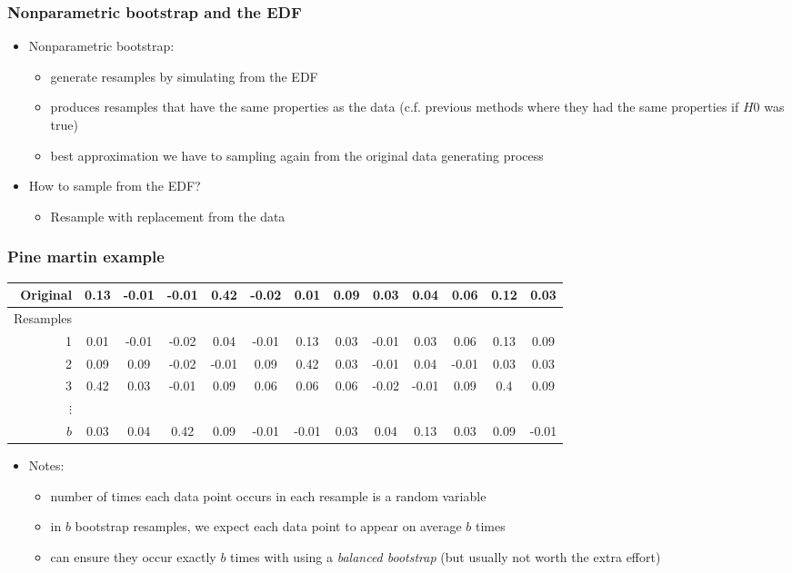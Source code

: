 \documentclass[a4paper,12pt]{article}
\newcommand{\bc}{\begin{center}}
\newcommand{\ec}{\end{center}}
\newcommand{\bi}{\begin{itemize}}
\newcommand{\ei}{\end{itemize}}
\begin{document}
\begin{frame}[fragile]
    \frametitle{Nonparametric bootstrap and the EDF}
    \bi
        \item <1-> Nonparametric bootstrap:
        \bi
            \item generate resamples by simulating from the EDF
            \item produces resamples that have the same properties as the data (c.f. previous methods where they had the same properties if $H0$ was true)
						\item best approximation we have to sampling again from the original data generating process
        \ei
        \item <2->How to sample from the EDF?
        \bi
            \item Resample with replacement from the data
        \ei
    \ei
\end{frame}

\begin{frame}
    \frametitle{Pine martin example}
\bc{\Tiny
\begin{tabular}{||r|c|c|c|c|c|c|c|c|c|c|c|c||}
\hline
\hline
Original & 0.13& -0.01& -0.01&  0.42& -0.02&  0.01&  0.09&  0.03&  0.04&  0.06&  0.12&  0.03\\
\hline
\hline
Resamples\\
 1 &0.01& -0.01& -0.02&  0.04& -0.01&  0.13&  0.03& -0.01&  0.03&  0.06&  0.13&  0.09\\
2 &0.09  &0.09& -0.02& -0.01&  0.09&  0.42 & 0.03 &-0.01&  0.04& -0.01&  0.03&  0.03\\
3 &  0.42&  0.03& -0.01&  0.09&  0.06&  0.06&  0.06& -0.02& -0.01&  0.09&  0.4&  0.09\\
$\vdots$\\
$b$ & 0.03  &0.04 & 0.42& 0.09 &-0.01 &-0.01 & 0.03 & 0.04 & 0.13 & 0.03 & 0.09& -0.01\\
\hline
\hline
\end{tabular}
}\ec
\vspace{0.1in}
    \bi
        \item Notes:
        \bi
            \item number of times each data point occurs in each resample is a random variable
            \item in $b$ bootstrap resamples, we expect each data point to appear on average $b$ times
            \item can ensure they occur exactly $b$ times with using a \textit{balanced bootstrap} (but usually not worth the extra effort)
        \ei
    \ei

\end{frame}
\end{document}

